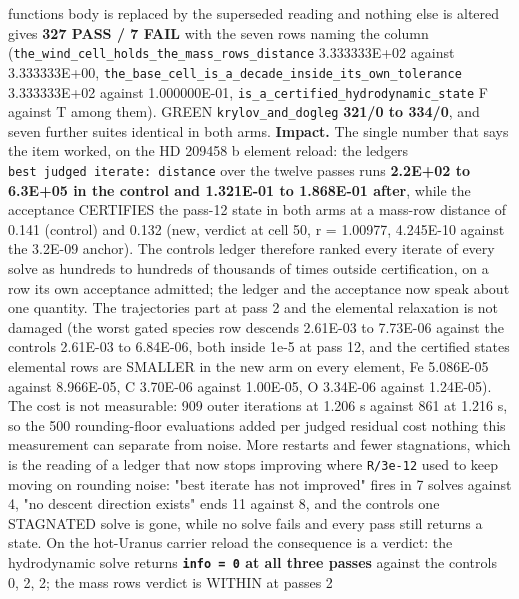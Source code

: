 \documentclass[english,a4paper]{my_memo}
\begin{document}
\begin{itemize}
  function\textquotesingle s body is replaced by the superseded reading and nothing else is
  altered gives \textbf{327 PASS / 7 FAIL} with the seven rows naming the column
  (\texttt{the\_wind\_cell\_holds\_the\_mass\_rows\_distance} 3.333333E+02 against
  3.333333E+00, \texttt{the\_base\_cell\_is\_a\_decade\_inside\_its\_own\_tolerance}
  3.333333E+02 against 1.000000E-01, \texttt{is\_a\_certified\_hydrodynamic\_state} F
  against T among them). GREEN \texttt{krylov\_and\_dogleg} \textbf{321/0 to 334/0}, and
  seven further suites identical in both arms. \textbf{Impact.} The single number
  that says the item worked, on the HD 209458 b element reload: the ledger\textquotesingle s
  \texttt{best\ judged\ iterate:\ distance} over the twelve passes runs \textbf{2.2E+02 to
  6.3E+05 in the control and 1.321E-01 to 1.868E-01 after}, while the
  acceptance CERTIFIES the pass-12 state in both arms at a mass-row distance of
  0.141 (control) and 0.132 (new, verdict at cell 50, r = 1.00977, 4.245E-10
  against the 3.2E-09 anchor). The control\textquotesingle s ledger therefore ranked every
  iterate of every solve as hundreds to hundreds of thousands of times outside
  certification, on a row its own acceptance admitted; the ledger and the
  acceptance now speak about one quantity. The trajectories part at pass 2 and
  the elemental relaxation is not damaged (the worst gated species row descends
  2.61E-03 to 7.73E-06 against the control\textquotesingle s 2.61E-03 to 6.84E-06, both inside
  1e-5 at pass 12, and the certified state\textquotesingle s elemental rows are SMALLER in the
  new arm on every element, Fe 5.086E-05 against 8.966E-05, C 3.70E-06 against
  1.00E-05, O 3.34E-06 against 1.24E-05). The cost is not measurable: 909 outer
  iterations at 1.206 s against 861 at 1.216 s, so the 500 rounding-floor
  evaluations added per judged residual cost nothing this measurement can
  separate from noise. More restarts and fewer stagnations, which is the
  reading of a ledger that now stops improving where \texttt{\textbar{}\textbar{}R\textbar{}\textbar{}/3e-12} used to keep
  moving on rounding noise: "best iterate has not improved" fires in 7 solves
  against 4, "no descent direction exists" ends 11 against 8, and the control\textquotesingle s
  one STAGNATED solve is gone, while no solve fails and every pass still
  returns a state. On the hot-Uranus carrier reload the consequence is a
  verdict: the hydrodynamic solve returns \textbf{\texttt{info\ =\ 0} at all three passes}
  against the control\textquotesingle s 0, 2, 2; the mass row\textquotesingle s verdict is WITHIN at passes 2

\end{itemize}
\end{document}
